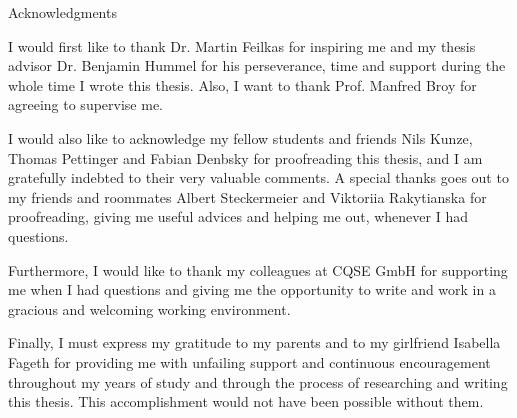 \thispagestyle{empty}

\vspace*{20mm}

\begin{center}
{ Acknowledgments}
\end{center}

\vspace{10mm}
I would first like to thank Dr. Martin Feilkas for inspiring me and my thesis advisor Dr. Benjamin Hummel for his perseverance, time and support during the whole time I wrote this thesis.
Also, I want to thank Prof. Manfred Broy for agreeing to supervise me.

I would also like to acknowledge my fellow students and friends Nils Kunze, Thomas Pettinger and Fabian Denbsky for proofreading this thesis, and I am gratefully indebted to their very valuable comments.
A special thanks goes out to my friends and roommates Albert Steckermeier and Viktoriia Rakytianska for proofreading, giving me useful advices and helping me out, whenever I had questions.

Furthermore, I would like to thank my colleagues at CQSE GmbH for supporting me when I had questions and giving me the opportunity to write and work in a gracious and welcoming working environment.

Finally, I must express my gratitude to my parents and to my girlfriend Isabella Fageth for providing me with unfailing support and continuous encouragement throughout my years of study and through the process of researching and writing this thesis.
This accomplishment would not have been possible without them.

\cleardoublepage{}

